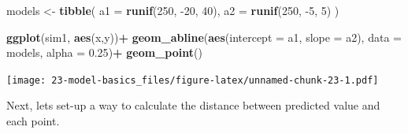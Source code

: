 \documentclass[]{book}
\newenvironment{Shaded}{\begin{snugshade}}{\end{snugshade}}
\newcommand{\DataTypeTok}[1]{\textcolor[rgb]{0.13,0.29,0.53}{#1}}
\newcommand{\DecValTok}[1]{\textcolor[rgb]{0.00,0.00,0.81}{#1}}
\newcommand{\FloatTok}[1]{\textcolor[rgb]{0.00,0.00,0.81}{#1}}
\newcommand{\KeywordTok}[1]{\textcolor[rgb]{0.13,0.29,0.53}{\textbf{#1}}}
\newcommand{\NormalTok}[1]{#1}
\newcommand{\OperatorTok}[1]{\textcolor[rgb]{0.81,0.36,0.00}{\textbf{#1}}}
\newcommand{\StringTok}[1]{\textcolor[rgb]{0.31,0.60,0.02}{#1}}
\theoremstyle{definition}
\theoremstyle{definition}
\theoremstyle{definition}
\theoremstyle{remark}
\begin{document}
\begin{Shaded}
\begin{Highlighting}[]
\NormalTok{models <-}\StringTok{ }\KeywordTok{tibble}\NormalTok{(}
  \DataTypeTok{a1 =} \KeywordTok{runif}\NormalTok{(}\DecValTok{250}\NormalTok{, }\DecValTok{-20}\NormalTok{, }\DecValTok{40}\NormalTok{),}
  \DataTypeTok{a2 =} \KeywordTok{runif}\NormalTok{(}\DecValTok{250}\NormalTok{, }\DecValTok{-5}\NormalTok{, }\DecValTok{5}\NormalTok{)}
\NormalTok{)}

\KeywordTok{ggplot}\NormalTok{(sim1, }\KeywordTok{aes}\NormalTok{(x,y))}\OperatorTok{+}
\StringTok{  }\KeywordTok{geom_abline}\NormalTok{(}\KeywordTok{aes}\NormalTok{(}\DataTypeTok{intercept =}\NormalTok{ a1, }\DataTypeTok{slope =}\NormalTok{ a2), }\DataTypeTok{data =}\NormalTok{ models, }\DataTypeTok{alpha =} \FloatTok{0.25}\NormalTok{)}\OperatorTok{+}
\StringTok{  }\KeywordTok{geom_point}\NormalTok{()}
\end{Highlighting}
\end{Shaded}

\texttt{[image: 23-model-basics\_files/figure-latex/unnamed-chunk-23-1.pdf]}

Next, lets set-up a way to calculate the distance between predicted
value and each point.

\begin{Shaded}
\end{Shaded}
\end{document}
